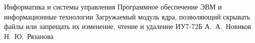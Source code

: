 \documentclass[a4paper]{bmstu}
\begin{document}
\makecourseworktitle
	{Информатика и системы управления}
	{Программное обеспечение ЭВМ и информационные технологии}
	{Загружаемый модуль ядра, позволяющий скрывать файлы или запрещать их изменение, чтение и удаление}
	{ИУ7-72Б}
	{А.~А.~Новиков}
	{Н.~Ю.~Рязанова}
	{}
	{}


% 

\maketableofcontents










\makebibliography

\end{document}
